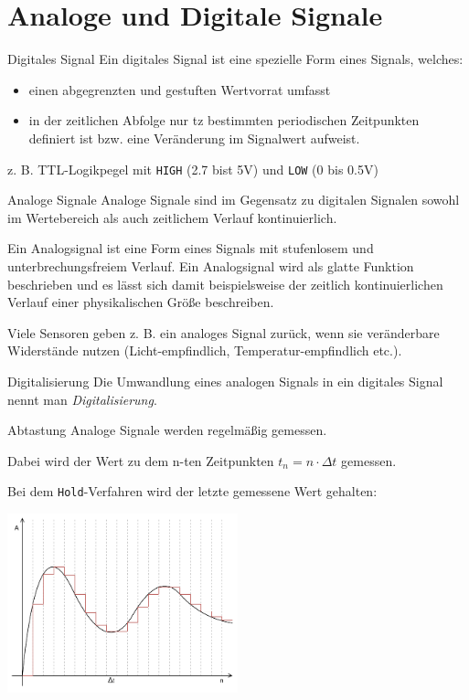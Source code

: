\section{Analoge und Digitale Signale}

\begin{defi}{Digitales Signal}
    Ein digitales Signal ist eine spezielle Form eines Signals, welches:
    \begin{itemize}
        \item einen abgegrenzten und gestuften Wertvorrat umfasst
        \item in der zeitlichen Abfolge nur tz bestimmten periodischen Zeitpunkten definiert ist bzw. eine Veränderung im Signalwert aufweist.
    \end{itemize}

    z. B. TTL-Logikpegel mit \texttt{HIGH} (2.7 bist 5V) und \texttt{LOW} (0 bis 0.5V)
\end{defi}

\begin{defi}{Analoge Signale}
    Analoge Signale sind im Gegensatz zu digitalen Signalen sowohl im Wertebereich als auch zeitlichem Verlauf kontinuierlich.

    Ein Analogsignal ist eine Form eines Signals mit stufenlosem und unterbrechungsfreiem Verlauf.
    Ein Analogsignal wird als glatte Funktion beschrieben und es lässt sich damit beispielsweise der zeitlich kontinuierlichen Verlauf einer physikalischen Größe beschreiben.

    Viele Sensoren geben z. B. ein analoges Signal zurück, wenn sie veränderbare Widerstände nutzen (Licht-empfindlich, Temperatur-empfindlich etc.).
\end{defi}

\begin{defi}{Digitalisierung}
    Die Umwandlung eines analogen Signals in ein digitales Signal nennt man \emph{Digitalisierung}.
\end{defi}

\begin{bonus}{Abtastung}
    Analoge Signale werden regelmäßig gemessen.

    Dabei wird der Wert zu dem n-ten Zeitpunkten $t_n = n \cdot \Delta t$ gemessen.

    Bei dem \texttt{Hold}-Verfahren wird der letzte gemessene Wert gehalten:

    \begin{center}
        \includegraphics[width=0.5\textwidth]{includes/figures/defi_abtastrate.pdf}
    \end{center}
\end{bonus}

